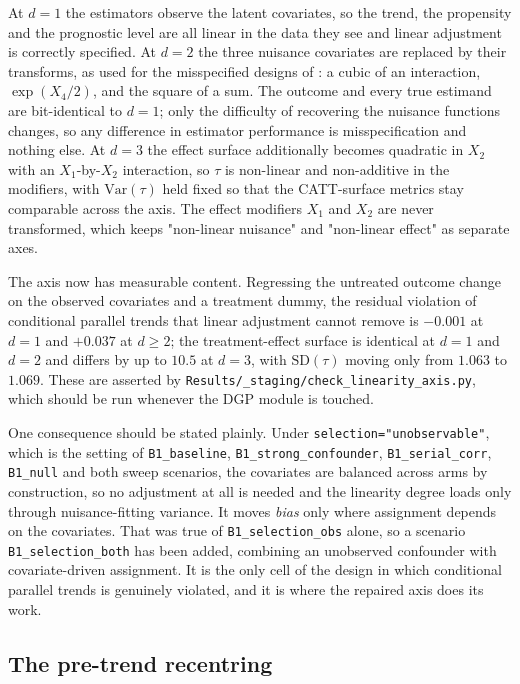 \documentclass[11pt]{article}
\begin{document}
At $d=1$ the estimators observe the latent covariates, so the trend, the
propensity and the prognostic level are all linear in the data they see and
linear adjustment is correctly specified. At $d=2$ the three nuisance
covariates are replaced by their \citet{KangSchafer2007} transforms, as used
for the misspecified designs of \citet{SantAnna2020}: a cubic of an
interaction, $\exp(X_4/2)$, and the square of a sum. The outcome and every true
estimand are bit-identical to $d=1$; only the difficulty of recovering the
nuisance functions changes, so any difference in estimator performance is
misspecification and nothing else. At $d=3$ the effect surface additionally
becomes quadratic in $X_2$ with an $X_1$-by-$X_2$ interaction, so $\tau$ is
non-linear and non-additive in the modifiers, with $\mathrm{Var}(\tau)$ held
fixed so that the CATT-surface metrics stay comparable across the axis. The
effect modifiers $X_1$ and $X_2$ are never transformed, which keeps
"non-linear nuisance" and "non-linear effect" as separate axes.

The axis now has measurable content. Regressing the untreated outcome change on
the observed covariates and a treatment dummy, the residual violation of
conditional parallel trends that linear adjustment cannot remove is $-0.001$ at
$d=1$ and $+0.037$ at $d \geq 2$; the treatment-effect surface is identical at
$d=1$ and $d=2$ and differs by up to $10.5$ at $d=3$, with
$\mathrm{SD}(\tau)$ moving only from $1.063$ to $1.069$. These are asserted by
\texttt{Results/\_staging/check\_linearity\_axis.py}, which should be run
whenever the DGP module is touched.

One consequence should be stated plainly. Under
\texttt{selection="unobservable"}, which is the setting of
\texttt{B1\_baseline}, \texttt{B1\_strong\_confounder},
\texttt{B1\_serial\_corr}, \texttt{B1\_null} and both sweep scenarios, the
covariates are balanced across arms by construction, so no adjustment at all is
needed and the linearity degree loads only through nuisance-fitting variance.
It moves \emph{bias} only where assignment depends on the covariates. That was
true of \texttt{B1\_selection\_obs} alone, so a scenario
\texttt{B1\_selection\_both} has been added, combining an unobserved confounder
with covariate-driven assignment. It is the only cell of the design in which
conditional parallel trends is genuinely violated, and it is where the repaired
axis does its work.

\subsection{The pre-trend recentring}
\end{document}

